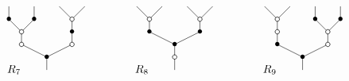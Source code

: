 \documentclass[../main.tex]{subfiles}
\begin{document}
\begin{ex}
    $$
        \xy
        <0.08cm, 0cm>:
        (0.0, 0.0)*{}="1"; %
        (0.0, 5.0)*=0{\bullet}="2"; %
        (-10.0, 10.0)*\cir<2pt>{}="3"; %
        (-10.0, 15.0)*\cir<2pt>{}="4"; %
        (-15.0, 20.0)*=0{\bullet}="5"; %
        (-15.0, 25.0)*{}="6"; %
        (-5.0, 20.0)*=0{\bullet}="7"; %
        (-5.0, 25.0)*{}="8"; %
        (10.0, 10.0)*\cir<2pt>{}="9"; %
        (10.0, 15.0)*=0{\bullet}="10"; %
        (10.0, 20.0)*\cir<2pt>{}="11"; %
        (5.0, 25.0)*{}="12"; %
        (15.0, 25.0)*{}="13"; %
        "1";"2" **\dir{-};
        "2";"3" **\dir{-};
        "3";"4" **\dir{-};
        "4";"5" **\dir{-};
        "5";"6" **\dir{-};
        "4";"7" **\dir{-};
        "7";"8" **\dir{-};
        "2";"9" **\dir{-};
        "9";"10" **\dir{-};
        "10";"11" **\dir{-};
        "11";"12" **\dir{-};
        "11";"13" **\dir{-};
        (-13,0)*{R_{7}};
        \endxy
        \xy
        <0.08cm, 0cm>:
        (-10, 0.0)*{}="1";
        (10, 10.0)*{}="2";
        \endxy
        \xy
        <0.08cm, 0cm>:
        (0.0, 0.0)*{}="1"; %
        (0.0, 5.0)*\cir<2pt>{}="2"; %
        (0.0, 10.0)*=0{\bullet}="3"; %
        (-10.0, 15.0)*=0{\bullet}="4"; %
        (-10.0, 20.0)*\cir<2pt>{}="5"; %
        (-15.0, 25.0)*{}="6"; %
        (-5.0, 25.0)*{}="7"; %
        (10.0, 15.0)*=0{\bullet}="8"; %
        (10.0, 20.0)*\cir<2pt>{}="9"; %
        (5.0, 25.0)*{}="10"; %
        (15.0, 25.0)*{}="11"; %
        "1";"2" **\dir{-};
        "2";"3" **\dir{-};
        "3";"4" **\dir{-};
        "4";"5" **\dir{-};
        "5";"6" **\dir{-};
        "5";"7" **\dir{-};
        "3";"8" **\dir{-};
        "8";"9" **\dir{-};
        "9";"10" **\dir{-};
        "9";"11" **\dir{-};
        (-13,0)*{R_{8}};
        \endxy
        \xy
        <0.08cm, 0cm>:
        (-10, 0.0)*{}="1";
        (10, 10.0)*{}="2";
        \endxy
        \xy
        <0.08cm, 0cm>:
        (0.0, 0.0)*{}="1"; %
        (0.0, 5.0)*=0{\bullet}="2"; %
        (-10.0, 10.0)*=0{\bullet}="3"; %
        (-10.0, 15.0)*\cir<2pt>{}="4"; %
        (-10.0, 20.0)*\cir<2pt>{}="5"; %
        (-15.0, 25.0)*{}="6"; %
        (-5.0, 25.0)*{}="7"; %
        (10.0, 10.0)*\cir<2pt>{}="8"; %
        (10.0, 15.0)*\cir<2pt>{}="9"; %
        (5.0, 20.0)*=0{\bullet}="10"; %
        (5.0, 25.0)*{}="11"; %
        (15.0, 20.0)*=0{\bullet}="12"; %
        (15.0, 25.0)*{}="13"; %
        "1";"2" **\dir{-};
        "2";"3" **\dir{-};
        "3";"4" **\dir{-};
        "4";"5" **\dir{-};
        "5";"6" **\dir{-};
        "5";"7" **\dir{-};
        "2";"8" **\dir{-};
        "8";"9" **\dir{-};
        "9";"10" **\dir{-};
        "10";"11" **\dir{-};
        "9";"12" **\dir{-};
        "12";"13" **\dir{-};
        (-13,0)*{R_{9}};
        \endxy
    $$


\end{ex}
\end{document}
